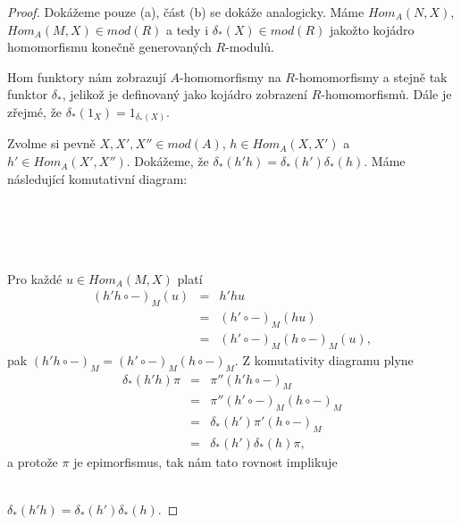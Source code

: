      \begin{proof}
       Dokážeme pouze (a), část (b) se dokáže analogicky. Máme 
       $Hom_A(N,X)$, $Hom_A(M,X)\in mod(R)$ a tedy i $\delta_*(X)\in mod(R)$ 
       jakožto kojádro homomorfismu konečně generovaných $R$-modulů. 
       
       Hom 
       funktory nám zobrazují $A$-homomorfismy na $R$-homomorfismy a stejně tak 
       funktor $\delta_*$, jelikož je definovaný jako kojádro zobrazení 
       $R$-homomorfismů. Dále je zřejmé, že $\delta_*(1_X)=1_{\delta_*(X)}$.
     
       Zvolme si pevně $X,X',X''\in mod(A)$, $h\in Hom_A(X,X')$ a $h'\in 
       Hom_A(X',X'')$. Dokážeme, že $\delta_*(h'h)=\delta_*(h')\delta_*(h)$. 
       Máme následující komutativní diagram: \\\\
       \centerline{
           }\\\\\\
       Pro každé $u\in Hom_A(M,X)$ platí
       \begin{eqnarray}
         (h'h\circ-)_M(u)
         &=& h'hu \nonumber \\
         &=& (h'\circ-)_M(hu) \nonumber \\
         &=& (h'\circ-)_M(h\circ-)_M(u), \nonumber
       \end{eqnarray}
       pak $(h'h\circ-)_M=(h'\circ-)_M(h\circ-)_M$. Z komutativity diagramu 
       plyne 
       \begin{eqnarray}
         \delta_*(h'h)\pi
         &=& \pi''(h'h\circ-)_M \nonumber \\
         &=& \pi''(h'\circ-)_M(h\circ-)_M  \nonumber \\
         &=& \delta_*(h')\pi'(h\circ-)_M \nonumber \\
         &=& \delta_*(h')\delta_*(h)\pi,  \nonumber 
       \end{eqnarray}
       a protože $\pi$ je epimorfismus, tak nám tato rovnost implikuje \\\\
       \centerline{ $\delta_*(h'h)=\delta_*(h')\delta_*(h)$.}
     \end{proof}
     
